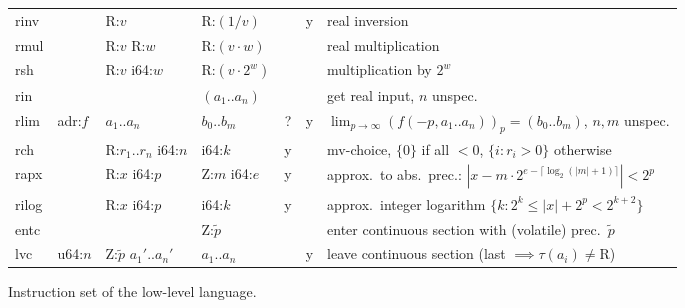 \documentclass[a4paper,parskip=half]{scrartcl}
\begin{document}
\begin{figure}[h]
\begin{tabular}{l|l|l|l@{\;\,\vline\,}c@{\,\vline\,}c@{\,\vline\;\,}l}
  \ttfamily rinv  &         & R:$v$           & R:$(1/v)$       & &y& real inversion \\
  \ttfamily rmul  &         & R:$v$ R:$w$     & R:$(v\cdot w)$  & && real multiplication \\
  \ttfamily rsh   &         & R:$v$ i64:$w$   & R:$(v\cdot2^w)$ & && multiplication by $2^w$ \\
  \ttfamily rin   &         &                 & $(a_1..a_n)$    & && get real input, $n$ unspec. \\
  \hline
  \ttfamily rlim  & adr:$f$ & $a_1..a_n$ & $b_0..b_m$ &?&y& $\lim_{p\to\infty}{(f(-p,a_1..a_n))_p} = (b_0..b_m)$, $n,m$ unspec. \\[-1.35ex]\hline\noalign{\vspace{\dimexpr 1.35ex-.5pt}}
  \ttfamily rch   &         & R:$r_1..r_n$ i64:$n$ & i64:$k$    &y&& mv-choice, $\{0\}$ if all $<0$, $\{i:r_i>0\}$ otherwise \\
  \ttfamily rapx  &         & R:$x$ i64:$p$   & Z:$m$ i64:$e$   &y&& approx.\ to abs.\ prec.: $|x-m\cdot2^{e-\lceil\log_2(|m|+1)\rceil}|<2^p$ \\
  \ttfamily rilog &         & R:$x$ i64:$p$   & i64:$k$         &y&& approx.\ integer logarithm $\{k:2^k\leq|x|+2^p<2^{k+2}\}$ \\
  \hline
  \ttfamily entc  &         &                           & Z:$\tilde p$ && & enter continuous section with (volatile) prec.\ $\tilde p$ \\
  \ttfamily lvc   & u64:$n$ & Z:$\tilde p$ $a_1'..a_n'$ & $a_1..a_n$   &&y& leave continuous section (last $\implies\tau(a_i)\neq\text{R}$)
\end{tabular}
\caption{Instruction set of the low-level language.}
\label{fig:instrs}
\end{figure}

\restoregeometry
\newpage

\newcommand*\dom{\operatorname{dom}}
\newcommand*\Top{\operatorname{top}}
\end{document}
